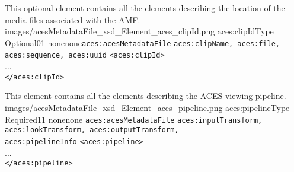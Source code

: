         {This optional element contains all the elements describing the location of the media files associated with the AMF.}
        {images/acesMetadataFile_xsd_Element_aces_clipId.png}
        {aces:clipIdType}
        {Optional}{0}{1}
        {none}{none}{\texttt{aces:acesMetadataFile}}
        {\texttt{aces:clipName, aces:file, aces:sequence, aces:uuid}}
        {\lstinline{<aces:clipId>} \\
        ... \\
        \lstinline{</aces:clipId>}}

        {This element contains all the elements describing the ACES viewing pipeline.}
        {images/acesMetadataFile_xsd_Element_aces_pipeline.png}
        {aces:pipelineType}
        {Required}{1}{1}
        {none}{none}
        {\texttt{aces:acesMetadataFile}}
        {\texttt{aces:inputTransform, aces:lookTransform, aces:outputTransform,\\ aces:pipelineInfo}}
        {\lstinline{<aces:pipeline>} \\
        ... \\
        \lstinline{</aces:pipeline>}}
